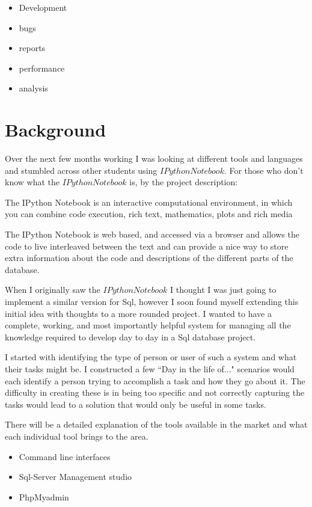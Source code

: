 \documentclass[a4paper, 11pt]{article}
\begin{document}
\begin{itemize}
  \item{Development}
  \item{bugs}
  \item{reports}
  \item{performance}
  \item{analysis}
\end{itemize}

\section{Background}

Over the next few months working I was looking at different tools and languages
and stumbled across other students using $IPython Notebook$. For those who don't
know what the $IPython Notebook$ is, by the project description:
\begin{displayquote}
The IPython Notebook is an interactive computational environment, in which
 you can combine code execution, rich text, mathematics, plots and rich media
 \cite{IPython Notebook}
\end{displayquote}
The IPython Notebook is web based, and accessed via a browser and allows the
code to live interleaved between the text and can provide a nice way to store
extra information about the code and descriptions of the different parts of the
database.

When I originally saw the $IPython Notebook$ I thought I was just going to
implement a similar version for Sql, however I soon found myself extending this
initial idea with thoughts to a more rounded project. I wanted to have a
complete, working, and most importantly helpful system for managing all the
knowledge required to develop day to day in a Sql database project.

I started with identifying the type of person or user of such a system and what
their tasks might be. I constructed a few ``Day in the life of..." scenarios
would each identify a person trying to accomplish a task and how they go about
it. The difficulty in creating these is in being too specific and not correctly
capturing the tasks would lead to a solution that would only be useful in
some tasks.

There will be a detailed explanation of the tools available in the market
and what each individual tool brings to the area.

\begin{itemize}
  \item{Command line interfaces}
  \item{Sql-Server Management studio}
  \item{PhpMyadmin}
\end{itemize}
\end{document}
